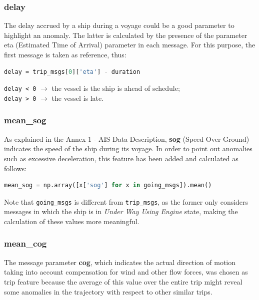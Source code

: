     \subsubsection{delay}
    
        The delay accrued by a ship during a voyage could be a good parameter to highlight an anomaly. The latter is calculated by the presence of the parameter eta (Estimated Time of Arrival) parameter in each message. For this purpose, the first message is taken as reference, thus:
        
        \begin{lstlisting}[language=Python]
delay = trip_msgs[0]['eta'] - duration
        \end{lstlisting} 
        
        \verb|delay < 0| $\rightarrow$ the vessel is the ship is ahead of schedule;
        \\
        \verb|delay > 0| $\rightarrow$ the vessel is late.
        
    \subsubsection{mean\_sog}
    
    As explained in the Annex 1 - AIS Data Description, \textbf{sog} (Speed Over Ground) indicates the speed of the ship during its voyage. In order to point out anomalies such as excessive deceleration, this feature has been added and calculated as follows:
    
    \begin{lstlisting}[language=Python]
mean_sog = np.array([x['sog'] for x in going_msgs]).mean()
    \end{lstlisting} 
    
    Note that \verb|going_msgs| is different from \verb|trip_msgs|, as the former only considers messages in which the ship is in \textit{Under Way Using Engine} state, making the calculation of these values more meaningful.
            
    \subsubsection{mean\_cog}
    
    The message parameter \textbf{cog}, which indicates the actual direction of motion taking into account compensation for wind and other flow forces, was chosen as trip feature because the average of this value over the entire trip might reveal some anomalies in the trajectory with respect to other similar trips.
    
